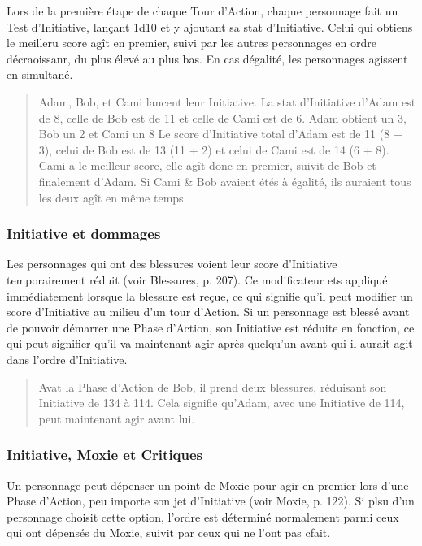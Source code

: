 Lors de la première étape de chaque Tour d'Action, chaque personnage fait un Test d'Initiative, lançant 1d10 et y ajoutant sa stat d'Initiative. Celui qui obtiens le meilleru score agît en premier, suivi par les autres personnages en ordre décraoissanr, du plus élevé au plus bas. En cas dégalité, les personnages agissent en simultané. 

\begin{quotation} Adam, Bob, et Cami lancent leur Initiative. La stat d'Initiative d'Adam est de 8, celle de Bob est de 11 et celle de Cami est de 6. Adam obtient un 3, Bob un 2 et Cami un 8 Le score d'Initiative total d'Adam est de 11 (8 + 3), celui de Bob est de 13 (11 + 2) et celui de Cami est de 14 (6 + 8). Cami a le meilleur score, elle agît donc en premier, suivit de Bob et finalement d'Adam. Si Cami \& Bob avaient étés à égalité, ils auraient tous les deux agît en même temps. \end{quotation} 

\subsubsection{Initiative et dommages} 

Les personnages qui ont des blessures voient leur score d'Initiative temporairement réduit (voir Blessures, p. 207). Ce modificateur ets appliqué immédiatement lorsque la blessure est reçue, ce qui signifie qu'il peut modifier un score d'Initiative au milieu d'un tour d'Action. Si un personnage est blessé avant de pouvoir démarrer une Phase d'Action, son Initiative est réduite en fonction, ce qui peut signifier qu'il va maintenant agir après quelqu'un avant qui il aurait agit dans l'ordre d'Initiative. 

\begin{quotation} Avat la Phase d'Action de Bob, il prend deux blessures, réduisant son Initiative de 134 à 114. Cela signifie qu'Adam, avec une Initiative de 114, peut maintenant agir avant lui. \end{quotation} 

\subsubsection{Initiative, Moxie et Critiques} 

Un personnage peut dépenser un point de Moxie pour agir en premier lors d'une Phase d'Action, peu importe son jet d'Initiative (voir Moxie, p. 122). Si plsu d'un personnage choisit cette option, l'ordre est déterminé normalement parmi ceux qui ont dépensés du Moxie, suivit par ceux qui ne l'ont pas cfait. 

